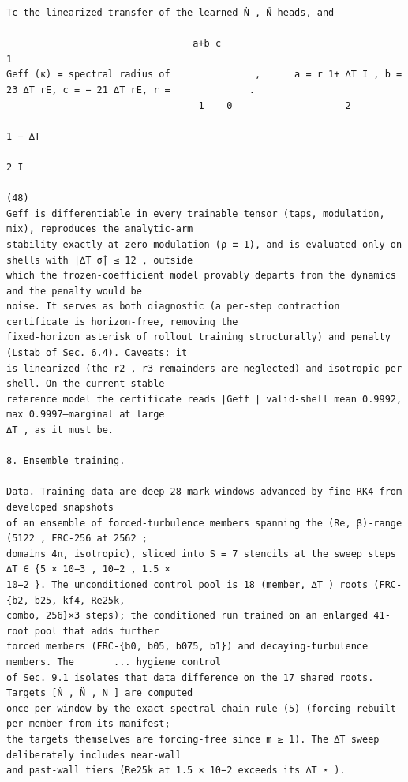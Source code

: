 \documentclass[letterpaper]{article}
\begin{document}
\begin{Verbatim}[fontsize=\fontsize{6.35}{7.15}\selectfont,breaklines=false]
Tc the linearized transfer of the learned Ṅ , N̈ heads, and
                                        
                                 a+b c                                                                    1
Geff (κ) = spectral radius of               ,      a = r 1+ ∆T I , b = 23 ∆T rE, c = − 21 ∆T rE, r =              .
                                  1    0                    2
                                                                                                        1 − ∆T
                                                                                                             2 I
                                                                                                     (48)
Geff is differentiable in every trainable tensor (taps, modulation, mix), reproduces the analytic-arm
stability exactly at zero modulation (ρ ≡ 1), and is evaluated only on shells with |∆T σ̂| ≤ 12 , outside
which the frozen-coefficient model provably departs from the dynamics and the penalty would be
noise. It serves as both diagnostic (a per-step contraction certificate is horizon-free, removing the
fixed-horizon asterisk of rollout training structurally) and penalty (Lstab of Sec. 6.4). Caveats: it
is linearized (the r2 , r3 remainders are neglected) and isotropic per shell. On the current stable
reference model the certificate reads |Geff | valid-shell mean 0.9992, max 0.9997—marginal at large
∆T , as it must be.

8. Ensemble training.

Data. Training data are deep 28-mark windows advanced by fine RK4 from developed snapshots
of an ensemble of forced-turbulence members spanning the (Re, β)-range (5122 , FRC-256 at 2562 ;
domains 4π, isotropic), sliced into S = 7 stencils at the sweep steps ∆T ∈ {5 × 10−3 , 10−2 , 1.5 ×
10−2 }. The unconditioned control pool is 18 (member, ∆T ) roots (FRC-{b2, b25, kf4, Re25k,
combo, 256}×3 steps); the conditioned run trained on an enlarged 41-root pool that adds further
forced members (FRC-{b0, b05, b075, b1}) and decaying-turbulence members. The       ... hygiene control
of Sec. 9.1 isolates that data difference on the 17 shared roots. Targets [Ṅ , N̈ , N ] are computed
once per window by the exact spectral chain rule (5) (forcing rebuilt per member from its manifest;
the targets themselves are forcing-free since m ≥ 1). The ∆T sweep deliberately includes near-wall
and past-wall tiers (Re25k at 1.5 × 10−2 exceeds its ∆T ⋆ ).


\end{Verbatim}
\end{document}
